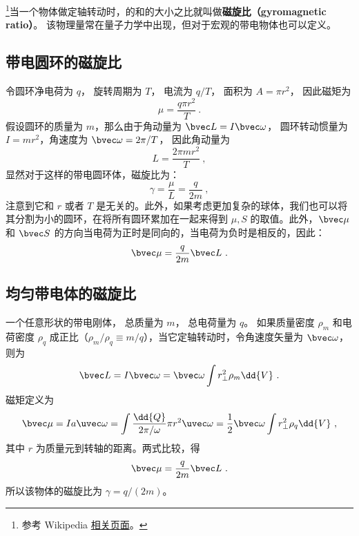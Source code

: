 


\footnote{参考 Wikipedia \href{https://en.wikipedia.org/wiki/Gyromagnetic_ratio}{相关页面}。}当一个物体做定轴转动时，的和的大小之比就叫做\textbf{磁旋比（gyromagnetic ratio）}。 该物理量常在量子力学中出现，但对于宏观的带电物体也可以定义。

\subsection{带电圆环的磁旋比}
令圆环净电荷为 $q$， 旋转周期为 $T$， 电流为 $q/T$， 面积为 $A= \pi r^2$， 因此磁矩为
\begin{equation}
\mu=\frac{q\pi r^2}{T}~.
\end{equation}
假设圆环的质量为 $m$，那么由于角动量为 $\bvec L = I\bvec\omega$， 圆环转动惯量为 $I = mr^2$，角速度为 $\bvec \omega = 2\pi/T$， 因此角动量为
\begin{equation}
L = \frac{2\pi m r^2}{T}~,
\end{equation}
显然对于这样的带电圆环体，磁旋比为：
\begin{equation}
\gamma = \frac{\mu}{L} = \frac{q}{2m}~,
\end{equation}
注意到它和 $r$ 或者 $T$ 是无关的。此外，如果考虑更加复杂的球体，我们也可以将其分割为小的圆环，在将所有圆环累加在一起来得到 $\mu,S$ 的取值。此外，$\bvec \mu$ 和 $\bvec S$ 的方向当电荷为正时是同向的，当电荷为负时是相反的，因此：
\begin{equation}
\bvec \mu = \frac{q}{2m}\bvec L~.
\end{equation}

\subsection{均匀带电体的磁旋比}
一个任意形状的带电刚体， 总质量为 $m$， 总电荷量为 $q$。 如果质量密度 $\rho_m$ 和电荷密度 $\rho_q$ 成正比（$\rho_m/\rho_q \equiv m/q$），当它定轴转动时，令角速度矢量为 $\bvec\omega$，则为
\begin{equation}
\bvec L = I\bvec \omega  = \bvec \omega \int r_\bot^2 \rho_m \dd{V}~.
\end{equation}
磁矩定义为
\begin{equation}
\bvec \mu  = Ia \uvec\omega = \int \frac{\dd{Q}}{2\pi/\omega}  \pi r^2 \uvec \omega
= \frac12 \bvec \omega \int r_\bot^2\rho_q \dd{V} ~,
\end{equation}
其中 $r$ 为质量元到转轴的距离。两式比较，得
\begin{equation}
\bvec \mu  = \frac{q}{2m} \bvec L~.
\end{equation}
所以该物体的磁旋比为 $\gamma = q/(2m)$。

